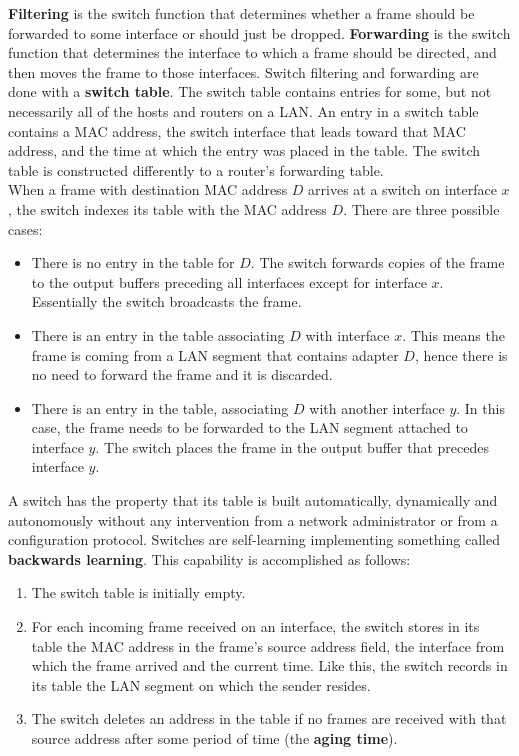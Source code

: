 \textbf{Filtering} is the switch function that determines whether a frame should be forwarded to some interface or should just be dropped. \textbf{Forwarding} is the switch function that determines the interface to which a frame should be directed, and then moves the frame to those interfaces. Switch filtering and forwarding are done with a \textbf{switch table}. The switch table contains entries for some, but not necessarily all  of the hosts and routers on a LAN. An entry in a switch table contains a MAC address, the switch interface that leads toward that MAC address, and the time at which the entry was placed in the table. The switch table is constructed differently to a router's forwarding table. \\
When a frame with destination MAC address $D$ arrives at a switch on interface $x$, the switch indexes its table with the MAC address $D$. There are three possible cases:
\begin{itemize}
\item There is no entry in the table for $D$. The switch forwards copies of the frame to the output buffers preceding all interfaces except for interface $x$. Essentially the switch broadcasts the frame.
\item There is an entry in the table associating $D$ with interface $x$. This means the frame is coming from a LAN segment that contains adapter $D$, hence there is no need to forward the frame and it is discarded.
\item There is an entry in the table, associating $D$ with another interface $y$. In this case, the frame needs to be forwarded to the LAN segment attached to interface $y$. The switch places the frame in the output buffer that precedes interface $y$.
\end{itemize}
A switch has the property that its table is built automatically, dynamically and autonomously without any intervention from a network administrator or from a configuration protocol. Switches are self-learning implementing something called \textbf{backwards learning}. This capability is accomplished as follows:
\begin{enumerate}
\item The switch table is initially empty.
\item For each incoming frame received on an interface, the switch stores in its table the MAC address in the frame's source address field, the interface from which the frame arrived and the current time. Like this, the switch records in its table the LAN segment on which the sender resides.
\item The switch deletes an address in the table if no frames are received with that source address after some period of time (the \textbf{aging time}). 
\end{enumerate}
